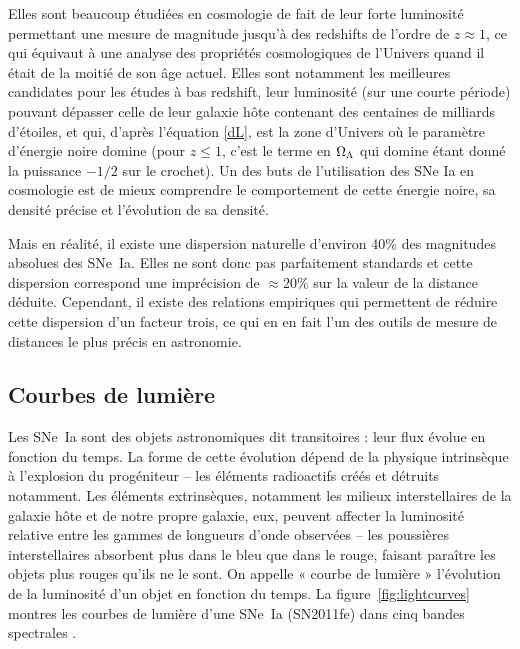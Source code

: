 \documentclass[a4paper, 12pt, svgnames]{article}
\begin{document}
Elles sont beaucoup étudiées en cosmologie de fait de leur forte luminosité
permettant une mesure de magnitude jusqu'à des redshifts de l'ordre de $z
\approx 1$, ce qui équivaut à une analyse des propriétés cosmologiques de
l'Univers quand il était de la moitié de son âge actuel. Elles sont notamment
les meilleures candidates pour les études à bas redshift, leur luminosité (sur
une courte période) pouvant dépasser celle de leur galaxie hôte contenant des
centaines de milliards d'étoiles,  et qui, d'après l'équation \ref{dL}, est la
zone d'Univers où le paramètre d'énergie noire domine (pour $z \leq 1$, c'est le
terme en $\Omega_\Lambda$ qui domine étant donné la puissance $-1/2$ sur le crochet). Un
des buts de l'utilisation des SNe Ia en cosmologie est de mieux comprendre le
comportement de cette énergie noire, sa densité précise et l'évolution de sa
densité. \bigbreak

Mais en réalité, il existe une dispersion naturelle d'environ 40\% des
magnitudes absolues des SNe~Ia. Elles ne sont donc pas parfaitement standards et
cette dispersion correspond une imprécision de $\approx 20\%$ sur la valeur de
la distance déduite. Cependant, il existe des relations empiriques qui
permettent de réduire cette dispersion d'un facteur trois, ce qui en en fait
l'un des outils de mesure de distances le plus précis en astronomie.

\subsection{Courbes de lumière}\label{ssec:lc}

Les SNe~Ia sont des objets astronomiques dit transitoires : leur flux évolue en
fonction du temps. La forme de cette évolution dépend de la physique intrinsèque
à l'explosion du progéniteur -- les éléments radioactifs créés et détruits
notamment. Les éléments extrinsèques, notamment les milieux interstellaires de
la galaxie hôte et de notre propre galaxie, eux, peuvent affecter la luminosité
relative entre les gammes de longueurs d'onde observées -- les poussières
interstellaires absorbent plus dans le bleu que dans le rouge, faisant paraître
les objets plus rouges qu'ils ne le sont. On appelle « courbe de lumière »
l'évolution de la luminosité d'un objet en fonction du temps. La
figure~\ref{fig:lightcurves} montres les courbes de lumière d'une SNe~Ia
(SN2011fe) dans cinq bandes spectrales \cite{pereira_spectrophotometric_2013}.
\end{document}
